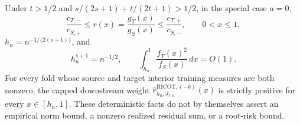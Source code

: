 Under \(t>1/2\) and \(s/(2s+1)+t/(2t+1)>1/2\), in the special case \(a=0\),
\[
\frac{c_{T,-}}{c_{S,+}}\le r(x)=\frac{g_T(x)}{g_S(x)}\le\frac{c_{T,+}}{c_{S,-}},\qquad 0<x\le1,
\]
\(h_n=n^{-1/\{2(s+1)\}}\), and
\[
h_n^{s+1}=n^{-1/2},\qquad \int_{h_n}^1\frac{f_T(x)^2}{f_S(x)}\,dx=O(1).
\]
For every fold whose source and target interior training measures are both nonzero, the capped downstream weight \(\widehat r^{\mathrm{RICOT},(-k)}_{h_n,J_{r,n}}(x)\) is strictly positive for every \(x\in[h_n,1]\). These deterministic facts do not by themselves assert an empirical norm bound, a nonzero realized residual sum, or a root-risk bound.